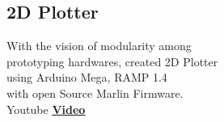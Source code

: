 \documentclass[]{font}
\begin{document}
\begin{minipage}[t]{0.35\textwidth}
\vspace{\topsep} %
\subsection{2D Plotter}
\textbullet{} With the vision of modularity among \\
prototyping hardwares, created 2D Plotter \\
using Arduino Mega, RAMP 1.4 \\
with open Source Marlin Firmware. \\
\textbullet{} Youtube \textbf{\href{https://www.youtube.com/watch?v=D679CJQNnKo&t=1s}{\underline{Video}} }
\sectionsep


%
%

\end{minipage} 
\hfill
\end{document}
